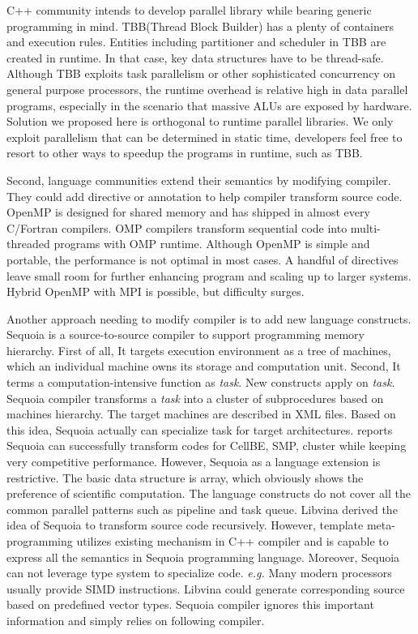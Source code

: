 \documentclass[10pt, conference, compsocconf]{IEEEtran}
\begin{document}
C++ community intends to develop parallel library while bearing generic programming in mind. TBB(Thread Block Builder) has a plenty of containers and execution rules. Entities including partitioner and scheduler in TBB are created in runtime. In that case, key data structures have to be thread-safe. Although TBB exploits task parallelism or other sophisticated concurrency on general purpose processors, the runtime overhead is relative high in data parallel programs, especially in the scenario that massive ALUs are exposed by hardware. Solution we proposed here is orthogonal to runtime parallel libraries. We only exploit parallelism that can be determined in static time, developers feel free to resort to other ways to speedup the programs in runtime, such as TBB.
 

Second, language communities extend their semantics by modifying compiler. They could add directive or annotation to help compiler transform source code. OpenMP is designed for shared memory and has shipped in almost every C/Fortran compilers. OMP compilers transform sequential code into multi-threaded programs with OMP runtime. Although OpenMP is simple and portable, the performance is not optimal in most cases. A handful of directives leave small room for further enhancing program and scaling up to larger systems. Hybrid OpenMP with MPI is possible, but difficulty surges.

Another approach needing to modify compiler is to add new language constructs. Sequoia is a source-to-source compiler to support programming memory hierarchy. First of all, It targets execution environment as a tree of machines, which an individual machine owns its storage and computation unit. Second, It terms a computation-intensive function as \textit{task}. New constructs apply on \emph{task}. Sequoia compiler transforms a \textit{task} into a cluster of subprocedures based on machines hierarchy. The target machines are described in XML files. Based on this idea, Sequoia actually can specialize task for target architectures. \cite{2} reports Sequoia can successfully transform codes for CellBE, SMP, cluster while keeping very competitive performance. However, Sequoia as a language extension is restrictive. The basic data structure is array, which obviously shows the preference of scientific computation. The language constructs do not cover all the common parallel patterns such as pipeline and task queue. Libvina derived the idea of Sequoia to transform source code recursively. However, template meta-programming utilizes existing mechanism in C++ compiler and is capable to express all the semantics in Sequoia programming language. Moreover, Sequoia can not leverage type system to specialize code. \textit{e.g.} Many modern processors usually provide SIMD instructions. Libvina could generate corresponding source based on predefined vector types. Sequoia compiler ignores this important information and simply relies on following compiler.
\end{document}
